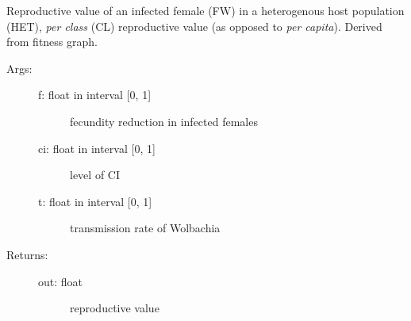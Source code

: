 \documentclass[letterpaper,10pt,english]{sphinxmanual}
\begin{document}
\begin{fulllineitems}
\label{index:wspec.analytical.reproval_FWHETCL}
Reproductive value of an infected female (FW) in a heterogenous 
host population (HET), \emph{per class} (CL) reproductive value (as 
opposed to \emph{per capita}). Derived from fitness graph.
\begin{description}
\item[{Args:}] \leavevmode\begin{description}
\item[{f: float in interval {[}0, 1{]}}] \leavevmode
fecundity reduction in infected females

\item[{ci: float in interval {[}0, 1{]}}] \leavevmode
level of CI

\item[{t: float in interval {[}0, 1{]}}] \leavevmode
transmission rate of Wolbachia

\end{description}

\item[{Returns:}] \leavevmode\begin{description}
\item[{out: float}] \leavevmode
reproductive value

\end{description}

\end{description}

\end{fulllineitems}

\end{document}
